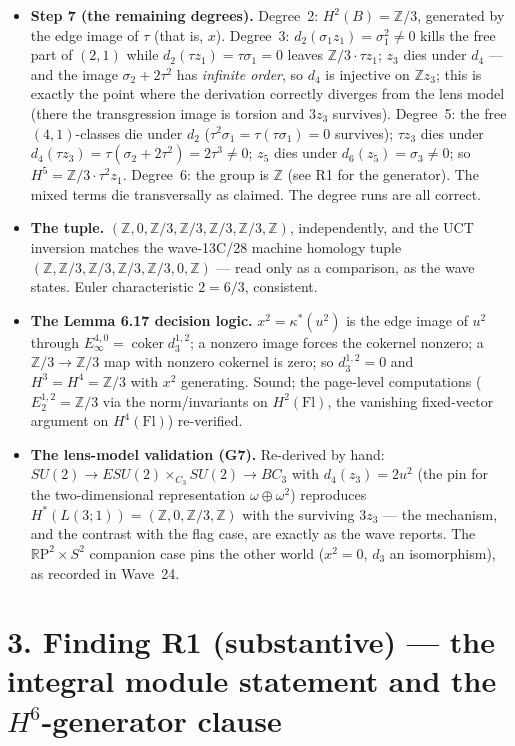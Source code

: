 \documentclass[11pt,a4paper]{article}
\newcommand{\Z}{\mathbb{Z}}
\newcommand{\R}{\mathbb{R}}
\newcommand{\Fl}{\mathrm{Fl}}
\begin{document}
\begin{itemize}[leftmargin=1.4em,itemsep=2pt]
\item \textbf{Step 7 (the remaining degrees).} Degree~2:
$H^2(B)=\Z/3$, generated by the edge image of $\tau$ (that is, $x$).
Degree~3: $d_2(\sigma_1z_1)=\sigma_1^2\ne0$ kills the free part of $(2,1)$
while $d_2(\tau z_1)=\tau\sigma_1=0$ leaves $\Z/3\cdot\tau z_1$; $z_3$ dies
under $d_4$ --- and the image $\sigma_2+2\tau^2$ has \emph{infinite order},
so $d_4$ is injective on $\Z z_3$; this is exactly the point where the
derivation correctly diverges from the lens model (there the transgression
image is torsion and $3z_3$ survives). Degree~5: the free $(4,1)$-classes die
under $d_2$ ($\tau^2\sigma_1=\tau(\tau\sigma_1)=0$ survives); $\tau z_3$ dies
under $d_4(\tau z_3)=\tau(\sigma_2+2\tau^2)=2\tau^3\ne0$; $z_5$ dies under
$d_6(z_5)=\sigma_3\ne0$; so $H^5=\Z/3\cdot\tau^2z_1$. Degree~6: the group is
$\Z$ (see R1 for the generator). The mixed terms die transversally as
claimed. The degree runs are all correct.

\item \textbf{The tuple.} $(\Z,0,\Z/3,\Z/3,\Z/3,\Z/3,\Z)$, independently,
and the UCT inversion matches the wave-13C/28 machine homology tuple
$(\Z,\Z/3,\Z/3,\Z/3,\Z/3,0,\Z)$ --- read only as a comparison, as the wave
states. Euler characteristic $2=6/3$, consistent.

\item \textbf{The Lemma 6.17 decision logic.} $x^2=\kappa^*(u^2)$ is the
edge image of $u^2$ through $E_\infty^{4,0}=\operatorname{coker}
d_3^{1,2}$; a nonzero image forces the cokernel nonzero; a
$\Z/3\to\Z/3$ map with nonzero cokernel is zero; so $d_3^{1,2}=0$ and
$H^3=H^4=\Z/3$ with $x^2$ generating. Sound; the page-level computations
($E_2^{1,2}=\Z/3$ via the norm/invariants on $H^2(\Fl)$, the vanishing
fixed-vector argument on $H^4(\Fl)$) re-verified.

\item \textbf{The lens-model validation (G7).} Re-derived by hand:
$SU(2)\to ESU(2)\times_{C_3}SU(2)\to BC_3$ with $d_4(z_3)=2u^2$ (the pin for
the two-dimensional representation $\omega\oplus\omega^2$) reproduces
$H^*(L(3;1))=(\Z,0,\Z/3,\Z)$ with the surviving $3z_3$ --- the mechanism,
and the contrast with the flag case, are exactly as the wave reports. The
$\R\mathrm{P}^2\times S^2$ companion case pins the other world ($x^2=0$,
$d_3$ an isomorphism), as recorded in Wave~24.
\end{itemize}

\section*{3. Finding R1 (substantive) --- the integral module statement and
the $H^6$-generator clause}
\end{document}
